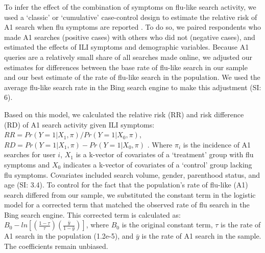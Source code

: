 \documentclass[fleqn,10pt]{wlscirep}
\begin{document}
To infer the effect of the combination of symptoms on flu-like search activity, we used a `classic' or `cumulative' case-control design to estimate the relative risk of A1 search when flu symptoms are reported \cite{king_and_zeng_2001}. To do so, we paired respondents who made A1 searches (positive cases) with others who did not (negative cases), and estimated the effects of ILI symptoms and demographic variables. Because A1 queries are a relatively small share of all searches made online, we adjusted our estimates for differences between the base rate of flu-like search in our sample and our best estimate of the rate of flu-like search in the population. We used the average flu-like search rate in the Bing search engine to make this adjustment (SI: 6). 

Based on this model, we calculated the relative risk (RR) and risk difference (RD) of A1 search activity given ILI symptoms: $ RR = Pr(Y=1|X_1, \pi) / Pr(Y=1|X_0, \pi) $, $ RD = Pr(Y=1|X_1, \pi) - Pr(Y=1|X_0, \pi) $ \cite{king_and_zeng_2001}. Where $\pi_i$ is the incidence of A1 searches for user $i$, $X_1$ is a k-vector of covariates of a `treatment' group with flu symptoms and $X_0$ indicates a k-vector of covariates of a `control' group lacking flu symptoms. Covariates included search volume, gender, parenthood status, and age (SI: 3.4). To control for the fact that the population's rate of flu-like (A1) search differed from our sample, we substituted the constant term in the logistic model for a corrected term that matched the observed rate of flu search in the Bing search engine. This corrected term is calculated as: $B_0 - ln[ (\frac{1-\tau}{\tau}) (\frac{\bar{y}}{1-\bar{y}}) ]$, where $B_0$ is the original constant term, $\tau$ is the rate of A1 search in the population (1.2e-5), and $\bar{y}$ is the rate of A1 search in the sample. The coefficients remain unbiased. 


\end{document}
